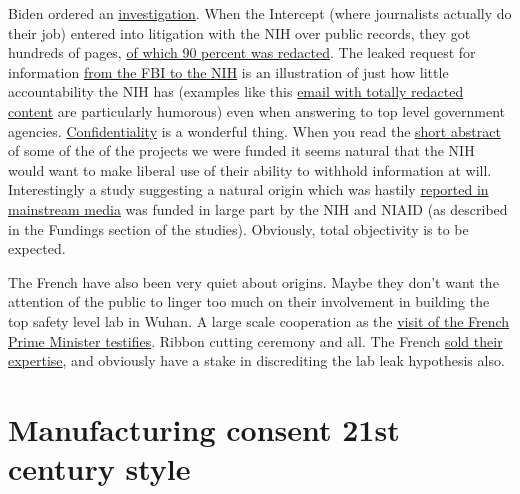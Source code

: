 \documentclass[11pt,a4paper]{article}
\begin{document}
Biden ordered an \href{https://www.bbc.com/news/world-us-canada-57260009}{investigation}. When the Intercept (where journalists actually do their job) entered into litigation with the NIH over public records, they got hundreds of pages, \href{https://theintercept.com/2022/02/20/nih-coronavirus-research-wuhan-redacted/}{of which 90 percent was redacted}. The leaked request for information \href{https://theintercept.com/2022/01/20/coronavirus-research-china-ecohealth-fbi/}{from the FBI to the NIH} is an illustration of just how little accountability the NIH has (examples like this \href{https://www.documentcloud.org/documents/21182424-pages-from-nih_foia_274}{email with totally redacted content} are particularly humorous) even when answering to top level government agencies. \href{https://grants.nih.gov/grants/policy/nihgps/html5/section_2/2.3.11_availability_and_confidentiality_of_information.htm}{Confidentiality} is a wonderful thing. When you read the \href{https://reporter.nih.gov/search/-bvPCvB7zkyvb1AjAgW5Yg/project-details/8674931}{short abstract} of some of the of the projects we were funded it seems natural that the NIH would want to make liberal use of their ability to withhold information at will. Interestingly a study suggesting a natural origin which was hastily \href{https://www.theguardian.com/world/2022/feb/26/coronavirus-wuhan-market-chinese-lab-studies}{reported in mainstream media} was funded in large part by the NIH and NIAID (as described in the Fundings section of the studies). Obviously, total objectivity is to be expected.

The French have also been very quiet about origins. Maybe they don't want the attention of the public to linger too much on their involvement in building the top safety level lab in Wuhan. A large scale cooperation as the \href{http://english.whiov.cas.cn/ne/201802/t20180208_189991.html}{visit of the French Prime Minister testifies}. Ribbon cutting ceremony and all. The French \href{https://www.challenges.fr/entreprise/sante-et-pharmacie/revelations-l-histoire-secrete-du-laboratoire-p4-de-wuhan-vendu-par-la-france-a-la-chine_707425}{sold their expertise}, and obviously have a stake in discrediting the lab leak hypothesis also. 

\section*{Manufacturing consent 21st century style}
\end{document}
